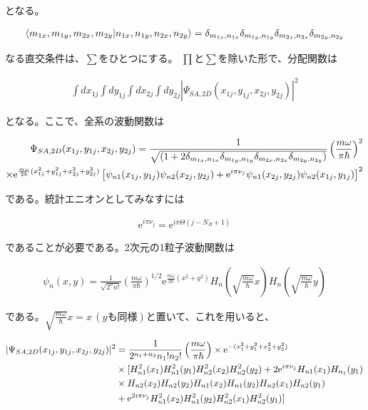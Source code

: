 \documentclass[a4paper,11pt]{jsarticle}
\numberwithin{equation}{section}
\begin{document}
となる。

\begin{align}
  \braket{m_{1x},m_{1y},m_{2x},m_{2y}}{n_{1x},n_{1y},n_{2x},n_{2y}}=\delta_{m_{1x},n_{1x}}\delta_{m_{1y},n_{1y}}\delta_{m_{2x},n_{2x}}\delta_{m_{2y},n_{2y}}
\end{align}

なる直交条件は、$\sum$をひとつにする。
$\prod$と$\sum$を除いた形で、分配関数は

\begin{align}
  \int dx_{1j}\int dy_{1j}\int dx_{2j}\int dy_{2j}|\Psi_{SA,2D}(x_{1j},y_{1j},x_{2j},y_{2j})|^2
\end{align}

となる。ここで、全系の波動関数は

\begin{align}
  \Psi_{SA,2D}(x_{1j},y_{1j},x_{2j},y_{2j})=\frac{1}{\sqrt{(1+2\delta_{m_{1x},n_{1x}}\delta_{m_{1y},n_{1y}}\delta_{m_{2x},n_{2x}}\delta_{m_{2y},n_{2y}})}}\left(\frac{m\omega}{\pi\hbar}\right)^2 \notag \\
  \times\mathrm{e}^{\frac{m\omega}{2\hbar}(x_{1j}^2+y_{1j}^2+x_{2j}^2+y_{2j}^2)} \left[\psi_{n1}(x_{1j},y_{1j})\psi_{n2}(x_{2j},y_{2j})+\mathrm{e}^{i\pi\nu_j}\psi_{n1}(x_{2j},y_{2j})\psi_{n2}(x_{1j},y_{1j})\right]^2
\end{align}

である。統計エニオンとしてみなすには

\begin{align}
  \mathrm{e}^{i\pi\nu_j}=\mathrm{e}^{i\pi\Theta(j-N_B+1)}
\end{align}

であることが必要である。2次元の1粒子波動関数は

\begin{align}
  \psi_n(x,y)=\frac{1}{\sqrt{2^n n!}}\left(\frac{m\omega}{\pi\hbar}\right)^{1/2}\mathrm{e}^{\frac{m\omega}{2\hbar}(x^2+y^2)}H_n\left(\sqrt{\frac{m\omega}{\hbar}}x\right)H_n\left(\sqrt{\frac{m\omega}{\hbar}}y\right)
\end{align}

である。$\sqrt{\frac{m\omega}{\hbar}}x=x\,(yも同様)$と置いて、これを用いると、

\begin{align}
  |\Psi_{SA,2D}(x_{1j},y_{1j},x_{2j},y_{2j})|^2&=\frac{1}{2^{n_1+n_2}n_1!n_2!}\left(\frac{m\omega}{\pi\hbar}\right)\times \mathrm{e}^{-(x_1^2+y_1^2+x_2^2+y_2^2)}\notag\\
  & \times[H_{n1}^2(x_1)H_{n1}^2(y_1)H_{n2}^2(x_2)H_{n2}^2(y_2)+2\mathrm{e}^{i\pi\nu_j}H_{n1}(x_1)H_{n_1}(y_1)\notag\\
  & \times H_{n2}(x_2)H_{n2}(y_2)H_{n1}(x_2)H_{n1}(y_2)H_{n2}(x_1)H_{n2}(y_1) \notag\\
  & +\mathrm{e}^{2i\pi\nu_j}H_{n1}^2(x_2)H_{n1}^2(y_2)H_{n2}^2(x_1)H_{n2}^2(y_1)] 
\end{align}
\end{document}
